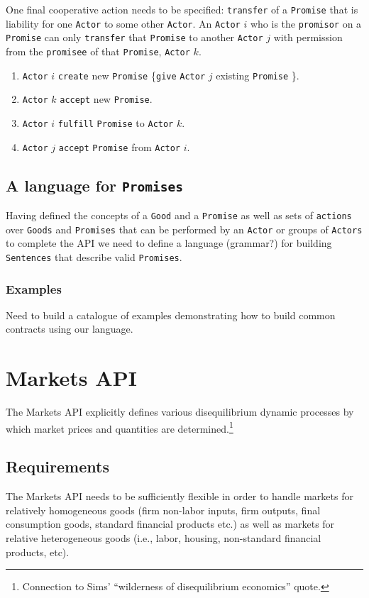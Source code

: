 \documentclass[a4paper]{article}
\begin{document}
One final cooperative action needs to be specified: \texttt{transfer} of a \texttt{Promise} that is liability for one \texttt{Actor} to some other \texttt{Actor}.  An \texttt{Actor} $i$ who is the \texttt{promisor} on a \texttt{Promise} can only \texttt{transfer} that \texttt{Promise} to another \texttt{Actor} $j$ with permission from the \texttt{promisee} of that \texttt{Promise}, \texttt{Actor} $k$. 
\begin{enumerate}
	\item \texttt{Actor} $i$ \texttt{create} new \texttt{Promise} \{\texttt{give} \texttt{Actor} $j$ existing \texttt{Promise} \}.
	\item \texttt{Actor} $k$ \texttt{accept} new \texttt{Promise}.
	\item \texttt{Actor} $i$ \texttt{fulfill} \texttt{Promise} to \texttt{Actor} $k$.
	\item \texttt{Actor} $j$ \texttt{accept} \texttt{Promise} from \texttt{Actor} $i$.
\end{enumerate}

\subsection{A language for \texttt{Promises}}
Having defined the concepts of a \texttt{Good} and a \texttt{Promise} as well as sets of \texttt{actions} over \texttt{Goods} and \texttt{Promises} that can be performed by an \texttt{Actor} or groups of \texttt{Actors} to complete the API we need to define a language (grammar?) for building \texttt{Sentences} that describe valid \texttt{Promises}. 

\subsubsection{Examples}
Need to build a catalogue of examples demonstrating how to build common contracts using our language.

\section{Markets API}
\label{Market API}

The Markets API explicitly defines various disequilibrium dynamic processes by which market prices and quantities are determined.\footnote{
%
Connection to Sims' ``wilderness of disequilibrium economics'' quote.
%
}

\subsection{Requirements} The Markets API needs to be sufficiently flexible in order to handle markets for relatively homogeneous goods (firm non-labor inputs, firm outputs, final consumption goods, standard financial products etc.) as well as markets for relative heterogeneous goods (i.e., labor, housing, non-standard financial products, etc).
\end{document}
